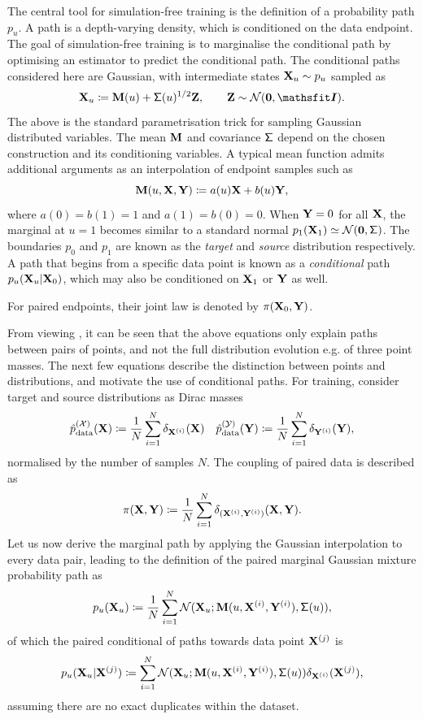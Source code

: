 The central tool for simulation-free training is the definition of a probability path $p_u$. A path is a depth-varying density, which is conditioned on the data endpoint. The goal of simulation-free training is to marginalise the conditional path by optimising an estimator to predict the conditional path. The conditional paths considered here are Gaussian, with intermediate states ${\mathbf{X}}_u\sim p_u$ sampled as
\[
\rmX_u\coloneqq\rmM(u)+\tSigma(u)^{1/2}\rmZ,\qquad \rmZ\sim\gN(\bm0,\tI).
\label{eq:xu_sample}
\]
The above is the standard parametrisation trick for sampling Gaussian distributed variables. The mean ${\mathbf{M}}$ and covariance ${\mathsf\Sigma}$ depend on the chosen construction and its conditioning variables. A typical mean function admits additional arguments as an interpolation of endpoint samples such as
\[
{\mathbf{M}}(u,{\mathbf{X}},{\mathbf{Y}})\coloneqq a(u){\mathbf{X}} + b(u){\mathbf{Y}},
\]
where $a(0)=b(1)=1$ and $a(1)=b(0)=0$. When ${\mathbf{Y}}=0$ for all ${\mathbf{X}}$, the marginal at $u=1$ becomes similar to a standard normal $p_1({\mathbf{X}}_1)\simeq{\mathcal{N}}(\bm0,{\mathsf\Sigma})$. The boundaries $p_0$ and $p_1$ are known as the \textit{target} and \textit{source} distribution respectively. A path that begins from a specific data point is known as a \textit{conditional} path $p_u({\mathbf{X}}_u|{\mathbf{X}}_0)$, which may also be conditioned on ${\mathbf{X}}_1$ or ${\mathbf{Y}}$ as well.

For paired endpoints, their joint law is denoted by $\pi({\mathbf{X}}_0,{\mathbf{Y}})$. 

From viewing , it can be seen that the above equations only explain paths between pairs of points, and not the full distribution evolution e.g. of three point masses. The next few equations describe the distinction between points and distributions, and motivate the use of conditional paths. For training, consider target and source distributions as Dirac masses
\[
\hat{p}_{\rm{data}}^{({\mathcal{X}})}({\mathbf{X}})\coloneqq\frac{1}{N}\sum_{i=1}^N\delta_{{\mathbf{X}}^{(i)}}({\mathbf{X}}) \quad
\hat{p}_{\rm{data}}^{({\mathcal{Y}})}({\mathbf{Y}})\coloneqq\frac{1}{N}\sum_{i=1}^N\delta_{{\mathbf{Y}}^{(i)}}({\mathbf{Y}}),
\]
normalised by the number of samples $N$.
The coupling of paired data is described as
\[
\pi({\mathbf{X}},{\mathbf{Y}})\coloneqq\frac{1}{N}\sum_{i=1}^N\delta_{({\mathbf{X}}^{(i)},{\mathbf{Y}}^{(i)})}({\mathbf{X}},{\mathbf{Y}}).
\]
Let us now derive the marginal path by applying the Gaussian interpolation to every data pair, leading to the definition of the paired marginal Gaussian mixture probability path as
\[
p_u({\mathbf{X}}_u)\coloneqq\frac{1}{N}\sum_{i=1}^N{\mathcal{N}}({\mathbf{X}}_u;{\mathbf{M}}(u,{\mathbf{X}}^{(i)},{\mathbf{Y}}^{(i)}),{\mathsf\Sigma}(u)),
\]
of which the paired conditional of paths towards data point ${\mathbf{X}}^{(j)}$ is
\[
p_u({\mathbf{X}}_u|{\mathbf{X}}^{(j)})\coloneq\sum_{i=1}^N{\mathcal{N}}({\mathbf{X}}_u;{\mathbf{M}}(u,{\mathbf{X}}^{(i)},{\mathbf{Y}}^{(i)}),{\mathsf\Sigma}(u))\delta_{{\mathbf{X}}^{(i)}}({\mathbf{X}}^{(j)}),
\]
assuming there are no exact duplicates within the dataset.

